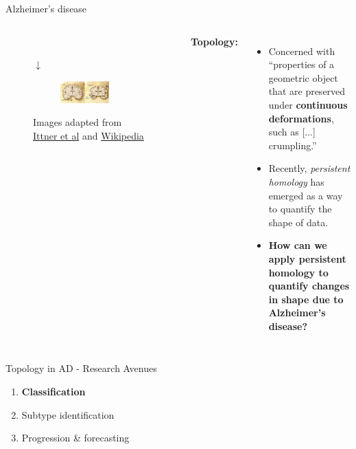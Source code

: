 \documentclass[aspectratio=169, 10pt, dvipsnames]{beamer}
\begin{document}
\begin{frame}[fragile]{Alzheimer's disease}
\begin{columns}[T,onlytextwidth]
{\begin{figure}
\begin{subfigure}{0.2\textwidth}
        \end{subfigure}\\
        \centering
        $\downarrow$\\
        \begin{subfigure}{\textwidth}
          \centering
          \includegraphics[width=0.8\textwidth]{figures/AD_brain_comparison.jpg}
        \end{subfigure}
        \scriptsize Images adapted from \href{https://www.nature.com/articles/nrn2967?foxtrotcallback=true}{Ittner et al} and \href{https://en.wikipedia.org/wiki/File:Alzheimer%27s_disease_brain_comparison.jpg}{Wikipedia}
      \end{figure}
    }
    \pause
    \textbf{Topology:}
    \begin{itemize}
    \pause\item Concerned with ``properties of a geometric object that are preserved under \textbf{continuous deformations}, such as [...] crumpling.''
    \pause\item Recently, \textit{persistent homology} has emerged as a way to
    quantify the shape of data.
    \pause\item \textbf{How can we apply persistent homology to quantify changes in shape due to Alzheimer's disease?}
    \end{itemize}
    \end{columns}
\end{frame}


\begin{frame}[fragile]{Topology in AD - Research Avenues}
  \begin{enumerate}
  \pause\item \textbf{Classification}
  \pause\item Subtype identification
  \pause\item Progression \& forecasting
  \end{enumerate}
\end{frame}
\end{document}
